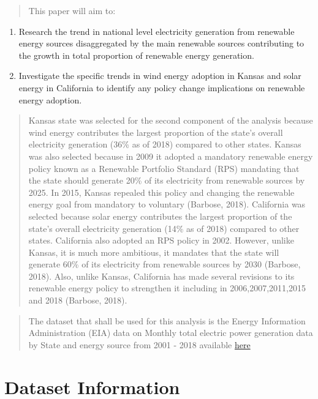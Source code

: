 \documentclass[12pt,]{article}
\begin{document}
\begin{quote}
This paper will aim to:
\end{quote}

\begin{enumerate}
\def\labelenumi{\arabic{enumi}.}
\item
  Research the trend in national level electricity generation from
  renewable energy sources disaggregated by the main renewable sources
  contributing to the growth in total proportion of renewable energy
  generation.
\item
  Investigate the specific trends in wind energy adoption in Kansas and
  solar energy in California to identify any policy change implications
  on renewable energy adoption.
\end{enumerate}

\begin{quote}
Kansas state was selected for the second component of the analysis
because wind energy contributes the largest proportion of the state's
overall electricity generation (36\% as of 2018) compared to other
states. Kansas was also selected because in 2009 it adopted a mandatory
renewable energy policy known as a Renewable Portfolio Standard (RPS)
mandating that the state should generate 20\% of its electricity from
renewable sources by 2025. In 2015, Kansas repealed this policy and
changing the renewable energy goal from mandatory to voluntary (Barbose,
2018). California was selected because solar energy contributes the
largest proportion of the state's overall electricity generation (14\%
as of 2018) compared to other states. California also adopted an RPS
policy in 2002. However, unlike Kansas, it is much more ambitious, it
mandates that the state will generate 60\% of its electricity from
renewable sources by 2030 (Barbose, 2018). Also, unlike Kansas,
California has made several revisions to its renewable energy policy to
strengthen it including in 2006,2007,2011,2015 and 2018 (Barbose, 2018).
\end{quote}

\begin{quote}
The dataset that shall be used for this analysis is the Energy
Information Administration (EIA) data on Monthly total electric power
generation data by State and energy source from 2001 - 2018 available
\href{https://www.eia.gov/electricity/data/state/generation_monthly.xlsx}{here}
\end{quote}

\newpage

\section{Dataset Information}\label{dataset-information}
\end{document}
